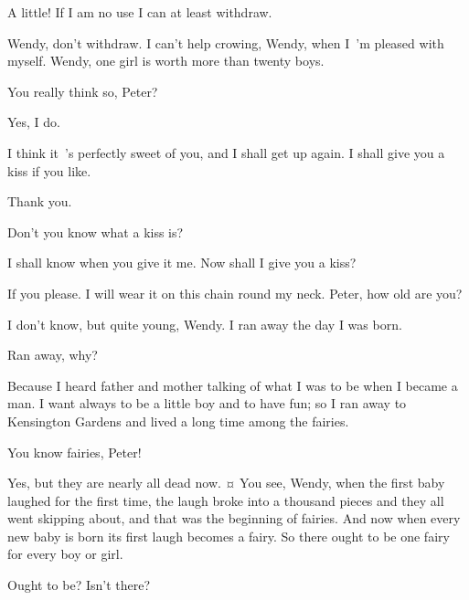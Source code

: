 \begin{drama}
A little!
If I am no use I can at least withdraw.


\peterspeaks
Wendy, don’t withdraw.
I can’t help crowing, Wendy, when I~’m pleased with myself.
Wendy, one girl is worth more than twenty boys.

You really think so, Peter?

\peterspeaks
Yes, I do.

\wendyspeaks
I think it~’s perfectly sweet of you, and I shall get up again.
I shall give you a kiss if you like.

\peterspeaks
Thank you.

Don’t you know what a kiss is?

\peterspeaks
I shall know when you give it me.
Now shall I give you a kiss?

If you please.
I will wear it on this chain round my neck.
Peter, how old are you?

I don’t know, but quite young, Wendy.
I ran away the day I was born.

\wendyspeaks
Ran away, why?

\peterspeaks
Because I heard father and mother talking of what I was to be when I became a man.
I want always to be a little boy and to have fun;
so I ran away to Kensington Gardens and lived a long time among the fairies.

You know fairies, Peter!

Yes, but they are nearly all dead now.
¤
You see, Wendy, when the first baby laughed for the first time,
the laugh broke into a thousand pieces and they all went skipping about,
and that was the beginning of fairies.
And now when every new baby is born its first laugh becomes a fairy.
So there ought to be one fairy for every boy or girl.

Ought to be?
Isn’t there?


\end{drama}
